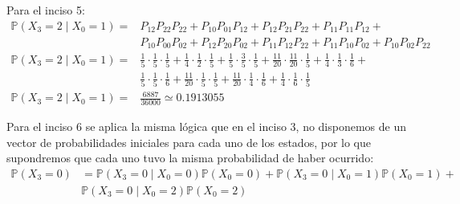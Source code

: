 \documentclass{article}
\begin{document}
            Para el inciso 5:
            \begin{equation*}
                \begin{split}
                    \mathbb{P}(X_3 = 2 \mid X_0 = 1) = & P_{12} P_{22} P_{22} + P_{10} P_{01} P_{12} + P_{12} P_{21} P_{22} +P_{11} P_{11} P_{12} + \\ & P_{10} P_{00} P_{02} + P_{12} P_{20} P_{02} + P_{11} P_{12} P_{22} + P_{11} P_{10} P_{02} + P_{10} P_{02} P_{22} \\
                    \mathbb{P}(X_3 = 2 \mid X_0 = 1) = & \frac{1}{5} \cdot \frac{1}{5} \cdot \frac{1}{5} + \frac{1}{4} \cdot \frac{1}{2} \cdot \frac{1}{5} + \frac{1}{5} \cdot \frac{3}{5} \cdot \frac{1}{5} + \frac{11}{20} \cdot \frac{11}{20} \cdot \frac{1}{5} + \frac{1}{4} \cdot \frac{1}{3} \cdot \frac{1}{6} + \\ &\frac{1}{5} \cdot \frac{1}{5} \cdot \frac{1}{6} + \frac{11}{20} \cdot \frac{1}{5} \cdot \frac{1}{5} + \frac{11}{20} \cdot \frac{1}{4} \cdot \frac{1}{6} + \frac{1}{4} \cdot \frac{1}{6} \cdot \frac{1}{5} \\
                    \mathbb{P}(X_3 = 2 \mid X_0 = 1) = & \frac{6887}{36000} \simeq 0.1913055
                \end{split}
            \end{equation*}

            Para el inciso 6 se aplica la misma lógica que en el inciso 3, no disponemos de un vector de probabilidades iniciales para cada uno de los estados, por lo que supondremos que cada uno tuvo la misma probabilidad de haber ocurrido:
            \begin{equation*}
                \begin{split}
                    \mathbb{P}(X_3 = 0) &= \mathbb{P}(X_3 = 0 \mid X_0 = 0) \mathbb{P}(X_0 = 0) + \mathbb{P}(X_3 = 0 \mid X_0 = 1) \mathbb{P}(X_0 = 1) + \\ & \mathbb{P}(X_3 = 0 \mid X_0 = 2) \mathbb{P}(X_0 = 2)
                \end{split}
            \end{equation*}
            
\end{document}
